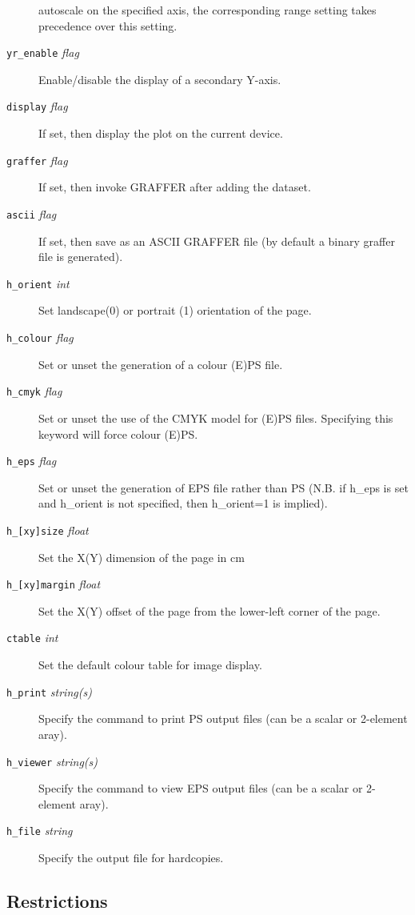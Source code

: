 \documentclass[11pt,twoside,english]{article}
\begin{document}
\begin{description}
  autoscale on the specified axis, the corresponding range setting
  takes precedence over this setting.
\item[\texttt{yr\_enable} \textit{flag}] Enable/disable the display of
  a secondary Y-axis.
\item[\texttt{display} \textit{flag}] If set, then display the plot on
  the current device.
\item[\texttt{graffer} \textit{flag}] If set, then invoke GRAFFER after
  adding the dataset.
\item[\texttt{ascii} \textit{flag}] If set, then save as an ASCII
  GRAFFER file (by default a binary graffer file is generated).
\item[\texttt{h\_orient} \textit{int}] Set landscape(0) or portrait (1)
  orientation of the page.
\item[\texttt{h\_colour} \textit{flag}] Set or unset the generation of
  a colour (E)PS file.
\item[\texttt{h\_cmyk} \textit{flag}] Set or unset the use of the CMYK
  model for (E)PS files. Specifying this keyword will force colour
  (E)PS.
\item[\texttt{h\_eps} \textit{flag}] Set or unset the generation of EPS
  file rather than PS (N.B. if h\_eps is set and h\_orient is not
  specified, then h\_orient=1 is implied).
\item[\texttt{h\_[xy]size} \textit{float}] Set the X(Y) dimension of
  the page in cm
\item[\texttt{h\_[xy]margin} \textit{float}] Set the X(Y) offset of the
  page from the lower-left corner of the page.
\item [\texttt{ctable} \textit{int}] Set the default colour table for
  image display.
\item[\texttt{h\_print} \textit{string(s)}] Specify the command to
  print PS output files (can be a scalar or 2-element aray).
\item[\texttt{h\_viewer} \textit{string(s)}] Specify the command to
  view EPS output files (can be a scalar or 2-element aray).
\item[\texttt{h\_file} \textit{string}] Specify the output file for
  hardcopies.
\end{description}



\subsection{Restrictions}
\label{sec:gp_restrict}
\end{document}
